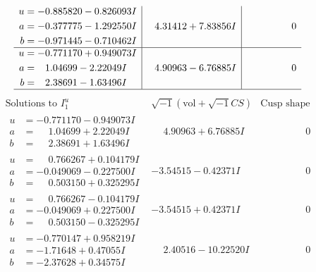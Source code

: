 \documentclass[1p]{elsarticle_modified}
\theoremstyle{definition}
\newcommand{\I}{\sqrt{-1}}
\begin{document}
$$\begin{array}{c|c|c}
\begin{aligned}
u &= -0.885820 - 0.826093 I \\
a &= -0.377775 - 1.292550 I \\
b &= -0.971445 - 0.710462 I\end{aligned}
 & \phantom{-}4.31412 + 7.83856 I & \phantom{-0.000000 } 0 \\ \hline\begin{aligned}
u &= -0.771170 + 0.949073 I \\
a &= \phantom{-}1.04699 - 2.22049 I \\
b &= \phantom{-}2.38691 - 1.63496 I\end{aligned}
 & \phantom{-}4.90963 - 6.76885 I & \phantom{-0.000000 } 0\\
 \hline 
 \end{array}$$\newpage$$\begin{array}{c|c|c}  
\text{Solutions to }I^u_{1}& \I (\text{vol} + \sqrt{-1}CS) & \text{Cusp shape}\\
 \hline 
\begin{aligned}
u &= -0.771170 - 0.949073 I \\
a &= \phantom{-}1.04699 + 2.22049 I \\
b &= \phantom{-}2.38691 + 1.63496 I\end{aligned}
 & \phantom{-}4.90963 + 6.76885 I & \phantom{-0.000000 } 0 \\ \hline\begin{aligned}
u &= \phantom{-}0.766267 + 0.104179 I \\
a &= -0.049069 - 0.227500 I \\
b &= \phantom{-}0.503150 + 0.325295 I\end{aligned}
 & -3.54515 - 0.42371 I & \phantom{-0.000000 } 0 \\ \hline\begin{aligned}
u &= \phantom{-}0.766267 - 0.104179 I \\
a &= -0.049069 + 0.227500 I \\
b &= \phantom{-}0.503150 - 0.325295 I\end{aligned}
 & -3.54515 + 0.42371 I & \phantom{-0.000000 } 0 \\ \hline\begin{aligned}
u &= -0.770147 + 0.958219 I \\
a &= -1.71648 + 0.47055 I \\
b &= -2.37628 + 0.34575 I\end{aligned}
 & \phantom{-}2.40516 - 10.22520 I & \phantom{-0.000000 } 0 \\ \hline\begin{aligned}

\end{aligned}
\end{array}$$
\end{document}
